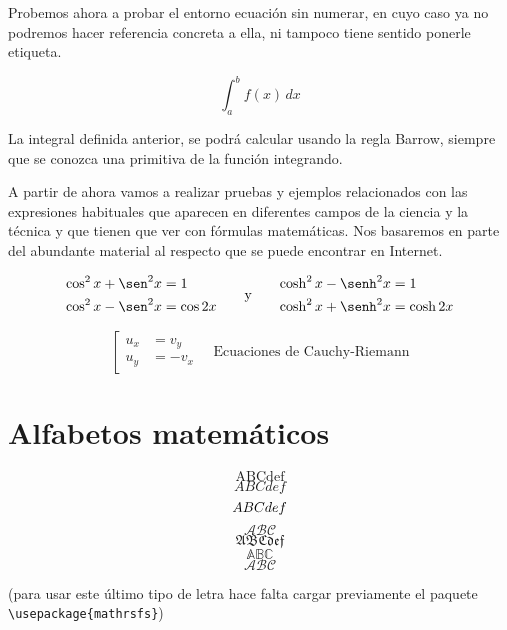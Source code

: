 \documentclass[11pt]{article}
\begin{document}
Probemos ahora a probar el entorno ecuación sin numerar, en cuyo caso ya no podremos hacer referencia concreta a ella, ni tampoco tiene sentido ponerle etiqueta.

\begin{Example}[gobble=0]
	\begin{equation*}%
	\int_a^b f(x)\, dx
	\end{equation*}
	
	La integral definida anterior,  se podr\'a calcular 
	usando la regla Barrow, siempre que se conozca una primitiva de 
	la funci\'on integrando.
	
\end{Example}


A partir de ahora vamos a realizar pruebas y ejemplos relacionados con las expresiones habituales que aparecen en diferentes campos de la ciencia y la técnica y que tienen que ver con fórmulas matemáticas. Nos basaremos en parte del abundante material al respecto que se puede encontrar en Internet. 


\begin{equation*}
  \begin{aligned}
      \cos^2x+\sen^2x  & = 1\\
      \cos^2x-\sen^2x & = \cos 2x
  \end{aligned}
    \qquad\text{y}\qquad
  \begin{aligned}
      \cosh^2x-\senh^2x & = 1\\
      \cosh^2x+\senh^2x & = \cosh 2x
  \end{aligned}
\end{equation*}


\begin{equation*}
  \left[
    \begin{aligned}
        u_x & = v_y\\
        u_y & = -v_x
    \end{aligned}
  \right.
 \quad\text{Ecuaciones de Cauchy-Riemann}
\end{equation*}

\section{Alfabetos matemáticos}

$$\mathrm{ABCdef}$$
$$\mathit{ABCdef}$$
$$\mathnormal{ABCdef}$$
$$\mathcal{ABC}$$
$$\mathfrak{ABCdef}$$
$$\mathbb{ABC}$$
$$\mathscr{ABC}$$

(para usar este último tipo de letra hace falta cargar previamente el paquete 
\verb|\usepackage{mathrsfs}|)
\end{document}
